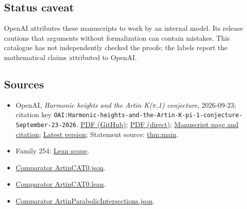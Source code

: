 \documentclass[11pt]{article}
\begin{document}
\subsection{Status caveat}
OpenAI attributes these manuscripts to work by an internal model. Its release cautions that arguments without formalization can contain mistakes. This catalogue has not independently checked the proofs; the labels report the mathematical claims attributed to OpenAI.

\subsection{Sources}
\begin{itemize}
\item OpenAI, \emph{Harmonic heights and the Artin K(\(\pi\),1) conjecture}, 2026-09-23; citation key \texttt{OAI:Harmonic-heights-and-the-Artin-K-pi-1-conjecture-September-23-2026}. \href{https://github.com/openai/math/blob/adc7f1241b42e322a6451854ab7e4b4c146bf78a/preprints/Harmonic-heights-and-the-Artin-K-pi-1-conjecture-September-23-2026/paper.pdf}{PDF (GitHub)}; \href{https://github.com/openai/math/raw/adc7f1241b42e322a6451854ab7e4b4c146bf78a/preprints/Harmonic-heights-and-the-Artin-K-pi-1-conjecture-September-23-2026/paper.pdf}{PDF (direct)}; \href{https://github.com/openai/math/blob/adc7f1241b42e322a6451854ab7e4b4c146bf78a/preprints/Harmonic-heights-and-the-Artin-K-pi-1-conjecture-September-23-2026/README.md}{Manuscript page and citation}; \href{https://github.com/openai/math/blob/main/preprints/Harmonic-heights-and-the-Artin-K-pi-1-conjecture-September-23-2026/paper.pdf}{Latest version}; Statement source: \href{https://github.com/openai/math/blob/adc7f1241b42e322a6451854ab7e4b4c146bf78a/preprints/Harmonic-heights-and-the-Artin-K-pi-1-conjecture-September-23-2026/build/sections/introduction.tex\#L22}{thm:main}.
\item Family 254: \href{https://github.com/openai/math/blob/adc7f1241b42e322a6451854ab7e4b4c146bf78a/lean/docs/254.md}{Lean scope}.
\item \href{https://github.com/openai/math/blob/adc7f1241b42e322a6451854ab7e4b4c146bf78a/lean/ComparatorChallenges/ArtinCAT0.json}{Comparator ArtinCAT0.json}.
\item \href{https://github.com/openai/math/blob/adc7f1241b42e322a6451854ab7e4b4c146bf78a/lean/ComparatorChallenges/ArtinCAT0.lean}{Comparator ArtinCAT0.lean}.
\item \href{https://github.com/openai/math/blob/adc7f1241b42e322a6451854ab7e4b4c146bf78a/lean/ComparatorChallenges/ArtinParabolicIntersections.json}{Comparator ArtinParabolicIntersections.json}.

\end{itemize}
\end{document}

